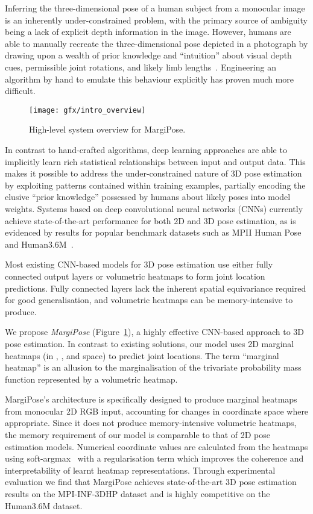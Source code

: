 \documentclass[australian,10pt,twocolumn,letterpaper,twocolumn]{article}
\newcommand{\ourmodel}{MargiPose}
\begin{document}
Inferring the three-dimensional pose of a human subject from a monocular
image is an inherently under-constrained problem, with the primary
source of ambiguity being a lack of explicit depth information in
the image. However, humans are able to manually recreate the three-dimensional
pose depicted in a photograph by drawing upon a wealth of prior knowledge
and ``intuition'' about visual depth cues, permissible joint rotations,
and likely limb lengths~\citep{marinoiu2016pictorial}. Engineering
an algorithm by hand to emulate this behaviour explicitly has proven
much more difficult.

\begin{figure}
\begin{centering}
\texttt{[image: gfx/intro\_overview]}
\par\end{centering}
\caption{\label{fig:overview}High-level system overview for \ourmodel{}.}
\end{figure}
In contrast to hand-crafted algorithms, deep learning approaches are
able to implicitly learn rich statistical relationships between input
and output data. This makes it possible to address the under-constrained
nature of 3D pose estimation by exploiting patterns contained within
training examples, partially encoding the elusive ``prior knowledge''
possessed by humans about likely poses into model weights. Systems
based on deep convolutional neural networks (CNNs) currently achieve
state-of-the-art performance for both 2D and 3D pose estimation, as
is evidenced by results for popular benchmark datasets such as MPII
Human Pose~\citep{andriluka20142d} and Human3.6M~\citep{ionescu2014human3}.

Most existing CNN-based models for 3D pose estimation use either fully
connected output layers or volumetric heatmaps to form joint location
predictions. Fully connected layers lack the inherent spatial equivariance
required for good generalisation, and volumetric heatmaps can be memory-intensive
to produce.

We propose \emph{\ourmodel{}} (Figure~\ref{fig:overview}), a highly
effective CNN-based approach to 3D pose estimation. In contrast to
existing solutions, our model uses 2D marginal heatmaps (in ,
, and  space) to predict joint locations. The term ``marginal
heatmap'' is an allusion to the marginalisation of the trivariate
probability mass function represented by a volumetric heatmap.

\ourmodel{}'s architecture is specifically designed to produce marginal
heatmaps from monocular 2D RGB input, accounting for changes in coordinate
space where appropriate. Since it does not produce memory-intensive
volumetric heatmaps, the memory requirement of our model is comparable
to that of 2D pose estimation models. Numerical coordinate values
are calculated from the heatmaps using soft-argmax~\citep{chapelle2010gradient,yi2016lift,luvizon2017human}
with a regularisation term which improves the coherence and interpretability
of learnt heatmap representations. Through experimental evaluation
we find that \ourmodel{} achieves state-of-the-art 3D pose estimation
results on the MPI-INF-3DHP dataset and is highly competitive on the
Human3.6M dataset.
\end{document}
